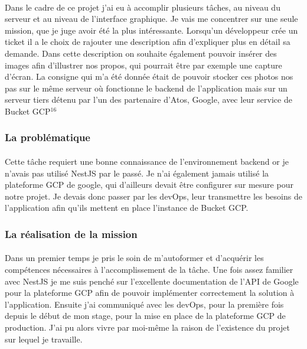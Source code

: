 \documentclass[12pt]{article}
\begin{document}
\begin {sloppypar}
\paragraph{}
Dans le cadre de ce projet j'ai eu à accomplir plusieurs tâches, au niveau du serveur et au niveau de 
l'interface graphique. Je vais me concentrer sur une seule mission, que je juge avoir été la plus 
intéressante. Lorsqu'un développeur crée un ticket il a le choix de rajouter une description afin 
d'expliquer plus en détail sa demande. Dans cette description on souhaite également pouvoir insérer 
des images afin d'illustrer nos propos, qui pourrait être par exemple une capture d'écran. La consigne 
qui m'a été donnée était de pouvoir stocker ces photos nos pas sur le même serveur où fonctionne 
le backend de l'application mais sur un serveur tiers détenu par l'un des partenaire d'Atos, Google, 
avec leur service de Bucket GCP$^{16}$

\subsubsection{La problématique}
\paragraph{}
Cette tâche requiert une bonne connaissance de l'environnement backend or je n'avais pas utilisé 
NestJS par le passé. Je n'ai également jamais utilisé la plateforme GCP de google, qui d'ailleurs 
devait être configurer sur mesure pour notre projet. Je devais donc passer par les devOps,
leur transmettre les besoins de l'application afin qu'ils mettent en place l'instance de Bucket GCP.

\subsubsection{La réalisation de la mission}
\paragraph{}
Dans un premier temps je pris le soin de m'autoformer et d'acquérir les compétences nécessaires 
à l'accomplissement de la tâche. Une fois assez familier avec NestJS je me suis penché sur l'excellente
documentation de l'API de Google pour la plateforme GCP afin de pouvoir implémenter correctement 
la solution à l'application. Ensuite j'ai communiqué avec les devOps, pour la première fois depuis 
le début de mon stage, pour la mise en place de la plateforme GCP de production. J'ai pu alors vivre 
par moi-même la raison de l'existence du projet sur lequel je travaille. 


\end{sloppypar}
\end{document}
